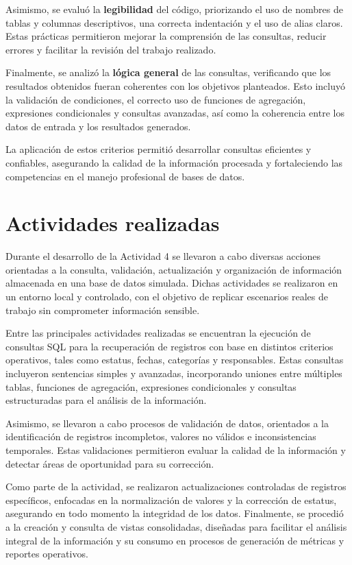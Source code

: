 \documentclass[12pt]{article}
\begin{document}
Asimismo, se evaluó la \textbf{legibilidad} del código, priorizando el uso de nombres de tablas y columnas descriptivos, una correcta indentación y el uso de alias claros. Estas prácticas permitieron mejorar la comprensión de las consultas, reducir errores y facilitar la revisión del trabajo realizado.

Finalmente, se analizó la \textbf{lógica general} de las consultas, verificando que los resultados obtenidos fueran coherentes con los objetivos planteados. Esto incluyó la validación de condiciones, el correcto uso de funciones de agregación, expresiones condicionales y consultas avanzadas, así como la coherencia entre los datos de entrada y los resultados generados.

La aplicación de estos criterios permitió desarrollar consultas eficientes y confiables, asegurando la calidad de la información procesada y fortaleciendo las competencias en el manejo profesional de bases de datos.


\section*{Actividades realizadas}
Durante el desarrollo de la Actividad 4 se llevaron a cabo diversas acciones orientadas a la consulta, validación, actualización y organización de información almacenada en una base de datos simulada. Dichas actividades se realizaron en un entorno local y controlado, con el objetivo de replicar escenarios reales de trabajo sin comprometer información sensible.

Entre las principales actividades realizadas se encuentran la ejecución de consultas SQL para la recuperación de registros con base en distintos criterios operativos, tales como estatus, fechas, categorías y responsables. Estas consultas incluyeron sentencias simples y avanzadas, incorporando uniones entre múltiples tablas, funciones de agregación, expresiones condicionales y consultas estructuradas para el análisis de la información.

Asimismo, se llevaron a cabo procesos de validación de datos, orientados a la identificación de registros incompletos, valores no válidos e inconsistencias temporales. Estas validaciones permitieron evaluar la calidad de la información y detectar áreas de oportunidad para su corrección.

Como parte de la actividad, se realizaron actualizaciones controladas de registros específicos, enfocadas en la normalización de valores y la corrección de estatus, asegurando en todo momento la integridad de los datos. Finalmente, se procedió a la creación y consulta de vistas consolidadas, diseñadas para facilitar el análisis integral de la información y su consumo en procesos de generación de métricas y reportes operativos.
\end{document}
